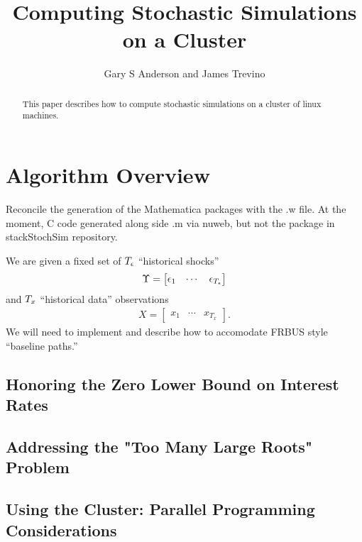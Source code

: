 \documentclass[12pt]{article}
\title{Computing Stochastic Simulations on a Cluster}
\author{Gary S Anderson and James Trevino}
\begin{document}
\maketitle


\section{Algorithm Overview}
\label{sec:algorithm-overview}
\begin{abstract}
This paper describes how to compute stochastic simulations on a cluster of linux machines.
\end{abstract}

\newpage
\tableofcontents
\newpage

Reconcile the generation of the Mathematica packages with the .w file. At the moment, C code generated along side .m via nuweb, but not the package in stackStochSim repository.

We are given a fixed set of ${T_\epsilon}$ ``historical shocks''
\begin{gather*}
  \Upsilon =
  \begin{bmatrix}
    \epsilon_1&\cdots&\epsilon_{{T_\epsilon}}
  \end{bmatrix}
\end{gather*}
and ${T_x}$ ``historical data'' observations
\begin{gather*}
  X =
  \begin{bmatrix}
    x_1&\cdots&x_{T_x}
  \end{bmatrix}.
\end{gather*}
We will need to implement and describe how to accomodate FRBUS style ``baseline paths.''

\subsection{Honoring the Zero Lower Bound on Interest Rates}
\label{sec:honoring-zero-lower}

\subsection{Addressing the "Too Many Large Roots" Problem}
\label{sec:addressing-too-many}

\subsection{Using the Cluster:  Parallel Programming Considerations}
\label{sec:using-clust-parall}
\end{document}
